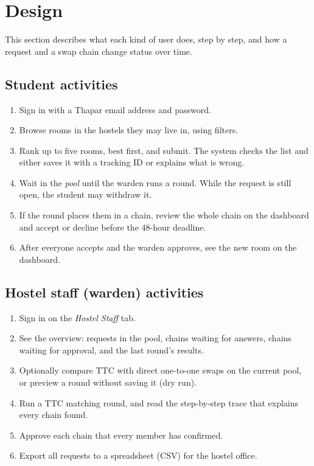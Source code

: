 \documentclass[11pt,a4paper,parskip=half,toc=listof]{scrreprt}
\begin{document}
\section{Design}\label{sec:design}

This section describes what each kind of user does, step by step, and how
a request and a swap chain change status over time.

\subsection{Student activities}

\begin{enumerate}
  \item Sign in with a Thapar email address and password.
  \item Browse rooms in the hostels they may live in, using filters.
  \item Rank up to five rooms, best first, and submit. The system checks
    the list and either saves it with a tracking ID or explains what is
    wrong.
  \item Wait in the \emph{pool} until the warden runs a round. While the
    request is still open, the student may withdraw it.
  \item If the round places them in a chain, review the whole chain on the
    dashboard and accept or decline before the 48-hour deadline.
  \item After everyone accepts and the warden approves, see the new room
    on the dashboard.
\end{enumerate}

\subsection{Hostel staff (warden) activities}

\begin{enumerate}
  \item Sign in on the \emph{Hostel Staff} tab.
  \item See the overview: requests in the pool, chains waiting for
    answers, chains waiting for approval, and the last round's results.
  \item Optionally compare TTC with direct one-to-one swaps on the current
    pool, or preview a round without saving it (dry run).
  \item Run a TTC matching round, and read the step-by-step trace that
    explains every chain found.
  \item Approve each chain that every member has confirmed.
  \item Export all requests to a spreadsheet (CSV) for the hostel office.
\end{enumerate}
\end{document}
